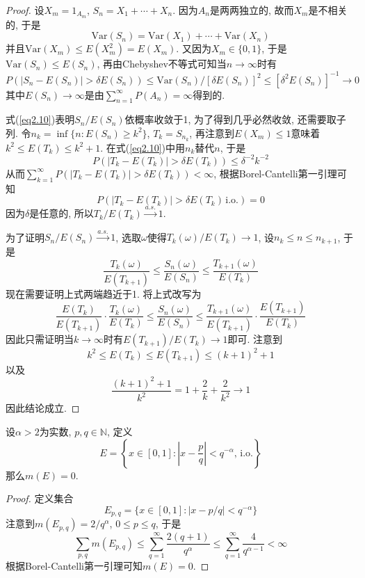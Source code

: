 \documentclass[cn, 12pt, math=mtpro2, bibstyle=apa, blue, twocol]{elegantbook}
\begin{document}
\begin{proof}
  设$X_m=1_{A_m}$, $S_n=X_1+\cdots+X_n$. 因为$A_n$是两两独立的, 故而$X_m$是不相关的, 于是
  $$\text{Var}(S_n)=\text{Var}(X_1)+\cdots+\text{Var}(X_n)$$
  并且$\text{Var}(X_m)\leq E(X_m^2)=E(X_m)$. 又因为$X_m\in\{0,1\}$, 于是$\text{Var}(S_n)\leq E(S_n)$, 再由Chebyshev不等式可知当$n\to\infty$时有
  \begin{equation}\label{eq2.10}
    P(|S_n-E(S_n)|>\delta E(S_n))\leq \text{Var}(S_n)/[\delta E(S_n)]^2\leq [\delta^2E(S_n)]^{-1}\to0
  \end{equation}
  其中$E(S_n)\to\infty$是由$\sum_{n=1}^{\infty}P(A_n)=\infty$得到的.

  式(\ref{eq2.10})表明$S_n/E(S_n)$依概率收敛于1, 为了得到几乎必然收敛, 还需要取子列. 令$n_k=\inf\{n: E(S_n)\geq k^2\}$, $T_k=S_{n_k}$, 再注意到$E(X_m)\leq1$意味着$k^2\leq E(T_k)\leq k^2+1$. 在式(\ref{eq2.10})中用$n_k$替代$n$, 于是
  $$P(|T_k-E(T_k)|>\delta E(T_k))\leq \delta^{-2}k^{-2}$$
  从而$\sum_{k=1}^{\infty}P(|T_k-E(T_k)|>\delta E(T_k))<\infty$, 根据Borel-Cantelli第一引理可知
  $$P(|T_k-E(T_k)|>\delta E(T_k)\,\text{i.o.})=0$$
  因为$\delta$是任意的, 所以$T_k/E(T_k)\xrightarrow{a.s.}1$.

  为了证明$S_n/E(S_n)\xrightarrow{a.s.}1$, 选取$\omega$使得$T_k(\omega)/E(T_k)\to1$, 设$n_k\leq n\leq n_{k+1}$, 于是
  $$\frac{T_k(\omega)}{E(T_{k+1})}\leq \frac{S_n(\omega)}{E(S_n)}\leq \frac{T_{k+1}(\omega)}{E(T_k)}$$
  现在需要证明上式两端趋近于1. 将上式改写为
  $$\frac{E(T_k)}{E(T_{k+1})}\cdot \frac{T_k(\omega)}{E(T_k)}\leq\frac{S_n(\omega)}{E(S_n)}\leq \frac{T_{k+1}(\omega)}{E(T_{k+1})}\cdot\frac{E(T_{k+1})}{E(T_k)}$$
  因此只需证明当$k\to\infty$时有$E(T_{k+1})/E(T_k)\to1$即可. 注意到
  $$k^2\leq E(T_k)\leq E(T_{k+1})\leq (k+1)^2+1$$
  以及
  $$\frac{(k+1)^2+1}{k^2}=1+\frac{2}{k}+\frac{2}{k^2}\to1$$
  因此结论成立.
\end{proof}

\begin{example}
设$\alpha>2$为实数, $p,q\in\mathbb{N}$, 定义
$$E=\left\{x\in[0,1]: \left|x-\frac{p}{q}\right|<q^{-\alpha},\,\text{i.o.}\right\}$$
那么$m(E)=0$.
\end{example}
\begin{proof}
  定义集合$$E_{p,q}=\{x\in[0,1]: |x-p/q|<q^{-\alpha}\}$$注意到$m(E_{p,q})=2/q^\alpha$, $0\leq p\leq q$, 于是
  $$\sum_{p,q}m(E_{p,q})\leq \sum_{q=1}^{\infty}\frac{2(q+1)}{q^\alpha}\leq\sum_{q=1}^{\infty}\frac{4}{q^{\alpha-1}}<\infty$$
  根据Borel-Cantelli第一引理可知$m(E)=0$.
\end{proof}
\end{document}
